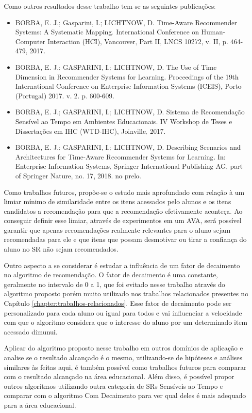 Como outros resultados desse trabalho tem-se as seguintes publicações:

\begin{itemize}
\item BORBA, E. J.; Gasparini, I.; LICHTNOW, D. Time-Aware Recommender Systems: A Systematic Mapping. International Conference on Human-Computer Interaction (HCI), Vancouver, Part II, LNCS 10272, v. II, p. 464-479, 2017.
\item BORBA, E. J.; GASPARINI, I.; LICHTNOW, D. The Use of Time Dimension in Recommender Systems for Learning. Proceedings of the 19th International Conference on Enterprise Information Systems (ICEIS), Porto (Portugal) 2017. v. 2. p. 600-609.
\item BORBA, E. J.; GASPARINI, I.; LICHTNOW, D. Sistema de Recomendação Sensível ao Tempo em Ambientes Educacionais. IV Workshop de Teses e Dissertações em IHC (WTD-IHC), Joinville, 2017.
\item BORBA, E. J.; GASPARINI, I.; LICHTNOW, D. Describing Scenarios and Architectures for Time-Aware Recommender Systems for Learning. In: Enterprise Information Systems, Springer International Publishing AG, part of Springer Nature, no. 17, 2018. no prelo.
\end{itemize}

Como trabalhos futuros, propõe-se o estudo mais aprofundado com relação à um limiar mínimo de similaridade entre os itens
acessados pelo alunos e os itens candidatos a recomendação para que a recomendação efetivamente aconteça. Ao conseguir
definir esse limiar, através de experimentos em um AVA, será possível garantir que apenas recomendações realmente relevantes
para o aluno sejam recomendadas para ele e que itens que possam desmotivar ou tirar a confiança do aluno no SR não
sejam recomendados.

Outro aspecto a se considerar é estudar a influência de um fator de decaimento no algoritmo de recomendação. O fator de
decaimento é uma constante, geralmente no intervalo de 0 a 1, que foi evitado nesse trabalho através do algoritmo proposto
porém muito utilizado nos trabalhos relacionados presentes no Capítulo \ref{chapter:trabalhos-relacionados}. Esse
fator de decaimento pode ser personalizado para cada aluno ou igual para todos e vai influenciar a velocidade com que o
algoritmo considera que o interesse do aluno por um determinado item acessado dimunui.

Aplicar do algoritmo proposto nesse trabalho em outros domínios de aplicação e analise se o resultado alcançado é o mesmo,
utilizando-se de hipóteses e análises similares às feitas aqui, é também possível como trabalhos futuros para comparar
com o resultado alcançado na área educacional. Além disso, é possível propor outros algoritmos utilizando outra categoria
de SRs Sensíveis ao Tempo e comparar com o algoritmo Com Decaimento para ver qual deles é mais adequado para a área educacional.
